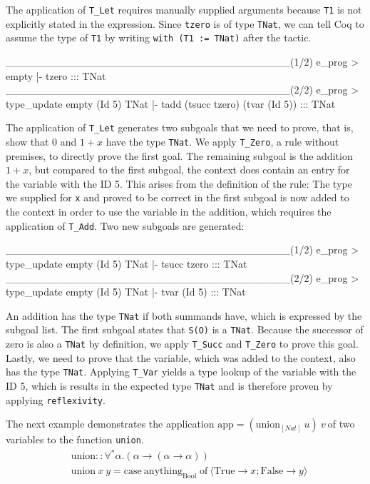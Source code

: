 \documentclass[paper = a4, fleqn, twoside]{scrreprt}
\newcommand{\coqinline}[1]{\texttt{#1}}
\begin{document}
The application of \coqinline{T_Let} requires manually supplied arguments because \coqinline{T1} is not explicitly stated in the expression. Since \coqinline{tzero} is of type \coqinline{TNat}, we can tell Coq to assume the type of \coqinline{T1} by writing \coqinline{with (T1 := TNat)} after the tactic.
\par
\begin{coqcode}
______________________________________(1/2)
e_prog > empty |- tzero ::: TNat
______________________________________(2/2)
e_prog > type_update empty (Id 5) TNat |- tadd (tsucc tzero) 
                                               (tvar (Id 5)) ::: TNat
\end{coqcode}
The application of \texttt{T\_Let} generates two subgoals that we need to prove, that is, show that 0 and $1 + x$ have the type \coqinline{TNat}. We apply \texttt{T\_Zero}, a rule without premises, to directly prove the first goal. The remaining subgoal is the addition $1 + x$, but compared to the first subgoal, the context does contain an entry for the variable with the ID 5. This arises from the definition of the rule: The type we supplied for \texttt{x} and proved to be correct in the first subgoal is now added to the context in order to use the variable in the addition, which requires the application of \texttt{T\_Add}. Two new subgoals are generated:
\begin{coqcode}
______________________________________(1/2)
e_prog > type_update empty (Id 5) TNat |- tsucc tzero ::: TNat
______________________________________(2/2)
e_prog > type_update empty (Id 5) TNat |- tvar (Id 5) ::: TNat
\end{coqcode}
An addition has the type \texttt{TNat} if both summands have, which is expressed by the subgoal list. The first subgoal states that \texttt{S(O)} is a \texttt{TNat}. Because the successor of zero is also a \texttt{TNat} by definition, we apply \texttt{T\_Succ} and \texttt{T\_Zero} to prove this goal. Lastly, we need to prove that the variable, which was added to the context, also has the type \texttt{TNat}. Applying \texttt{T\_Var} yields a type lookup of the variable with the ID 5, which is results in the expected type \texttt{TNat} and is therefore proven by applying \texttt{reflexivity}.\\
\par \noindent
The next example demonstrates the application $\text{app} = (\text{union}_{[Nat]} \: u) \: v \:$of two variables to the function \texttt{union}.
\begin{align*}
&\text{union}::\forall^{*}\alpha.(\alpha \rightarrow (\alpha \rightarrow \alpha))\\
&\text{union}\: x \: y = \text{case}\: \text{anything}_{\text{Bool}} \; \text{of}\: \langle \text{True} \rightarrow x; \text{False} \rightarrow y\rangle
\end{align*}
\end{document}
